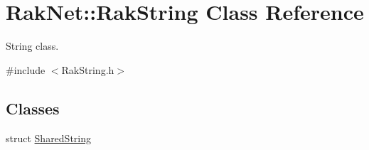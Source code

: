\hypertarget{class_rak_net_1_1_rak_string}{\section{Rak\-Net\-:\-:Rak\-String Class Reference}
\label{class_rak_net_1_1_rak_string}
}


String class.  




{\ttfamily \#include $<$Rak\-String.\-h$>$}

\subsection*{Classes}
\begin{DoxyCompactItemize}
\item 
struct \hyperlink{struct_rak_net_1_1_rak_string_1_1_shared_string}{Shared\-String}
\end{DoxyCompactItemize}
